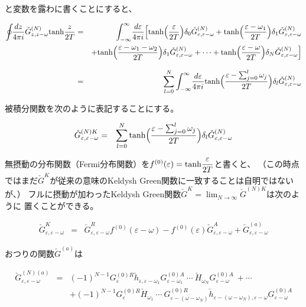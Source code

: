 \documentclass[uplatex,a4j,12pt,dvipdfmx]{jsarticle}
\begin{document}
と変数を露わに書くことにすると、

\begin{eqnarray}
	\oint \!\! \dfrac{dz}{4 \pi i}
	\check{G}^{(N)}_{z,z - \omega}
	{\rm tanh} \dfrac{z}{2 T}
	&=&
	\int^{\infty}_{-\infty} \! \dfrac{d \varepsilon}{4 \pi i}
	\Big[
	{\rm tanh} \Big( \dfrac{\varepsilon}{2 T} \Big)
	\delta_{0} \check{G}^{(N)}_{\varepsilon , \varepsilon - \omega}
	+
	{\rm tanh} \Big( \dfrac{\varepsilon - \omega_{1}}{2 T} \Big)
	\delta_{1} \check{G}^{(N)}_{\varepsilon , \varepsilon - \omega}
	\nonumber \\ &&
	+
	{\rm tanh} \Big( \dfrac{\varepsilon - \omega_{1} - \omega_{2}}{2 T} \Big)
	\delta_{1} \check{G}^{(N)}_{\varepsilon , \varepsilon - \omega}
	+
	\cdots
	+
	{\rm tanh} \Big( \dfrac{\varepsilon - \omega}{2 T} \Big)
	\delta_{N} \check{G}^{(N)}_{\varepsilon , \varepsilon - \omega}
	\Big]
	\nonumber \\[3mm] &=&
	\sum_{l=0}^{N}
	\int^{\infty}_{-\infty} \! \dfrac{d \varepsilon}{4 \pi i}
	{\rm tanh} \Big( \dfrac{\varepsilon - \sum_{j=0}^{l} \omega_{j} }{2 T} \Big)
	\delta_{l} \check{G}^{(N)}_{\varepsilon , \varepsilon - \omega}
\end{eqnarray}

被積分関数を次のように表記することにする。

\begin{eqnarray}
	\check{G}^{(N)K}_{\varepsilon , \varepsilon - \omega}
	&=&
	\sum_{l=0}^{N}
	{\rm tanh} \Big( \dfrac{\varepsilon - \sum_{j=0}^{l} \omega_{j} }{2 T} \Big)
	\delta_{l} \check{G}^{(N)}_{\varepsilon , \varepsilon - \omega}
\end{eqnarray}

無摂動の分布関数（Fermi分布関数）を$f^{(0)}(\varepsilon) = {\rm tanh}\dfrac{\varepsilon}{2 T}$と書くと、
（この時点ではまだ$\check{G}^{K}$が従来の意味のKeldysh Green関数に一致することは自明ではないが、）
フルに摂動が加わったKeldysh Green関数$\check{G}^{K} = \displaystyle \lim_{N \to \infty} \check{G}^{(N)K}$は次のように
置くことができる。

\begin{eqnarray}
	\check{G}^{K}_{\varepsilon , \varepsilon - \omega}
	&=&
	\check{G}^{R}_{\varepsilon , \varepsilon - \omega}
	f^{(0)}(\varepsilon - \omega)
	-
	f^{(0)}(\varepsilon)
	\check{G}^{A}_{\varepsilon , \varepsilon - \omega}
	+
	\check{G}^{(a)}_{\varepsilon , \varepsilon - \omega}
\end{eqnarray}

おつりの関数$\check{G}^{(a)}$は

\begin{eqnarray}
	\check{G}^{(N)(a)}_{\varepsilon , \varepsilon - \omega}
	&=&
	(-1)^{N-1}
	G^{(0)R}_{\varepsilon}
	\check{h}_{\varepsilon , \varepsilon - \omega_{1}}
	G^{(0)A}_{\varepsilon - \omega_{1}}
	\ \cdots \
	\check{H}_{\omega_{N}}
	G^{(0)A}_{\varepsilon - \omega}
	\ + \cdots
	\nonumber \\ && +
	(-1)^{N-1}
	G^{(0)R}_{\varepsilon}
	\check{H}_{\omega_{1}}
	\ \cdots \
	G^{(0)R}_{\varepsilon - ( \omega - \omega_{N} )}
	\check{h}_{\varepsilon - ( \omega - \omega_{N} ) , \varepsilon - \omega}
	G^{(0)A}_{\varepsilon - \omega}
\end{eqnarray}
\end{document}
